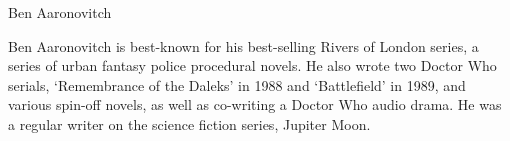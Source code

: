 {\Large Ben Aaronovitch}

\begin{figure}
	\vspace{-10mm}
	\vspace{-10mm}
\end{figure}

Ben Aaronovitch is best-known for his best-selling Rivers of London series, a series of urban fantasy police procedural novels. He also wrote two Doctor Who serials, `Remembrance of the Daleks' in 1988 and `Battlefield' in 1989, and various spin-off novels, as well as co-writing a Doctor Who audio drama. He was a regular writer on the science fiction series, Jupiter Moon.